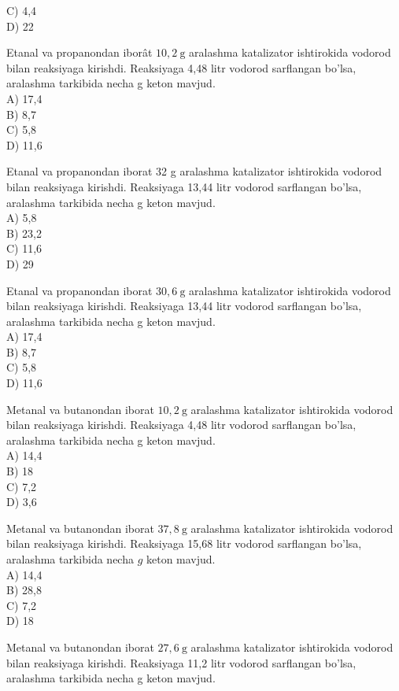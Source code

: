 C) 4,4\\
D) 22
  \item Etanal va propanondan iborât $10,2 \mathrm{~g}$ aralashma katalizator ishtirokida vodorod bilan reaksiyaga kirishdi. Reaksiyaga 4,48 litr vodorod sarflangan bo'lsa, aralashma tarkibida necha g keton mavjud.\\
A) 17,4\\
B) 8,7\\
C) 5,8\\
D) 11,6
  \item Etanal va propanondan iborat 32 g aralashma katalizator ishtirokida vodorod bilan reaksiyaga kirishdi. Reaksiyaga 13,44 litr vodorod sarflangan bo'lsa, aralashma tarkibida necha g keton mavjud.\\
A) 5,8\\
B) 23,2\\
C) 11,6\\
D) 29
  \item Etanal va propanondan iborat $30,6 \mathrm{~g}$ aralashma katalizator ishtirokida vodorod bilan reaksiyaga kirishdi. Reaksiyaga 13,44 litr vodorod sarflangan bo'lsa, aralashma tarkibida necha g keton mavjud.\\
A) 17,4\\
B) 8,7\\
C) 5,8\\
D) 11,6
  \item Metanal va butanondan iborat $10,2 \mathrm{~g}$ aralashma katalizator ishtirokida vodorod bilan reaksiyaga kirishdi. Reaksiyaga 4,48 litr vodorod sarflangan bo'lsa, aralashma tarkibida necha g keton mavjud.\\
A) 14,4\\
B) 18\\
C) 7,2\\
D) 3,6
  \item Metanal va butanondan iborat $37,8 \mathrm{~g}$ aralashma katalizator ishtirokida vodorod bilan reaksiyaga kirishdi. Reaksiyaga 15,68 litr vodorod sarflangan bo'lsa, aralashma tarkibida necha $g$ keton mavjud.\\
A) 14,4\\
B) 28,8\\
C) 7,2\\
D) 18
  \item Metanal va butanondan iborat $27,6 \mathrm{~g}$ aralashma katalizator ishtirokida vodorod bilan reaksiyaga kirishdi. Reaksiyaga 11,2 litr vodorod sarflangan bo'lsa, aralashma tarkibida necha g keton mavjud.\\

